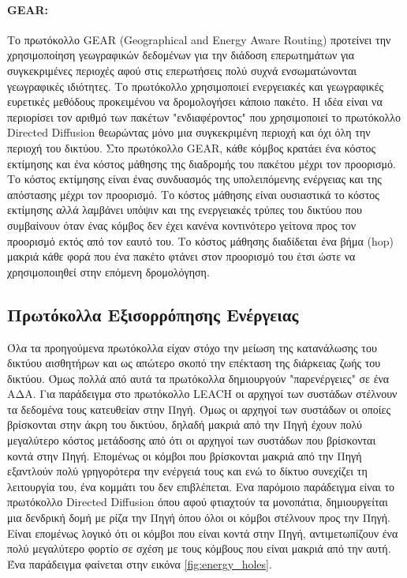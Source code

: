 \paragraph{GEAR:} Το πρωτόκολλο GEAR (Geographical and Energy Aware Routing) \cite{gear_protocol} προτείνει την χρησιμοποίηση γεωγραφικών δεδομένων για την διάδοση
επερωτημάτων για συγκεκριμένες περιοχές αφού στις επερωτήσεις πολύ συχνά ενσωματώνονται γεωγραφικές ιδιότητες. Το πρωτόκολλο χρησιμοποιεί ενεργειακές και γεωγραφικές
ευρετικές μεθόδους προκειμένου να δρομολογήσει κάποιο πακέτο. Η ιδέα είναι να περιορίσει τον αριθμό των πακέτων "ενδιαφέροντος" που χρησιμοποιεί το πρωτόκολλο
Directed Diffusion \cite{directed_diffusion} θεωρώντας μόνο μια συγκεκριμένη περιοχή και όχι όλη την περιοχή του δικτύου. Στο πρωτόκολλο GEAR, κάθε κόμβος κρατάει
ένα κόστος εκτίμησης και ένα κόστος μάθησης της διαδρομής του πακέτου μέχρι τον προορισμό. Το κόστος εκτίμησης είναι ένας συνδυασμός της υπολειπόμενης ενέργειας και
της απόστασης μέχρι τον προορισμό. Το κόστος μάθησης είναι ουσιαστικά το κόστος εκτίμησης αλλά λαμβάνει υπόψιν και της ενεργειακές τρύπες του δικτύου που συμβαίνουν
όταν ένας κόμβος δεν έχει κανένα κοντινότερο γείτονα προς τον προορισμό εκτός από τον εαυτό του. Το κόστος μάθησης διαδίδεται ένα βήμα (hop) μακριά κάθε φορά που ένα
πακέτο φτάνει στον προορισμό του έτσι ώστε να χρησιμοποιηθεί στην επόμενη δρομολόγηση.




\subsection{Πρωτόκολλα Εξισορρόπησης Ενέργειας}
Όλα τα προηγούμενα πρωτόκολλα είχαν στόχο την μείωση της κατανάλωσης του δικτύου αισθητήρων και ως απώτερο σκοπό την επέκταση της διάρκειας ζωής του δικτύου.
Όμως πολλά από αυτά τα πρωτόκολλα δημιουργούν "παρενέργειες" σε ένα ΑΔΑ.
Για παράδειγμα στο πρωτόκολλο LEACH \cite{leach_protocol} οι αρχηγοί των συστάδων στέλνουν τα δεδομένα τους κατευθείαν στην Πηγή. Όμως οι αρχηγοί των συστάδων οι
οποίες βρίσκονται στην άκρη του δικτύου, δηλαδή μακριά από την Πηγή έχουν πολύ μεγαλύτερο κόστος μετάδοσης από ότι οι αρχηγοί των συστάδων που βρίσκονται κοντά στην
Πηγή.
Επομένως οι κόμβοι που βρίσκονται μακριά από την Πηγή εξαντλούν πολύ γρηγορότερα την ενέργειά τους και ενώ το δίκτυο συνεχίζει τη λειτουργία του, ένα κομμάτι
του δεν επιβλέπεται.
Ενα παρόμοιο παράδειγμα είναι το πρωτόκολλο Directed Diffusion \cite{directed_diffusion} όπου αφού φτιαχτούν τα μονοπάτια, δημιουργείται μια δενδρική δομή με ρίζα την
Πηγή όπου όλοι οι κόμβοι στέλνουν προς την Πηγή.
Είναι επομένως λογικό ότι οι κόμβοι που είναι κοντά στην Πηγή, αντιμετωπίζουν ένα πολύ μεγαλύτερο φορτίο σε σχέση με τους κόμβους που είναι μακριά από την αυτή.
Ένα παράδειγμα φαίνεται στην εικόνα \ref{fig:energy_holes}.

